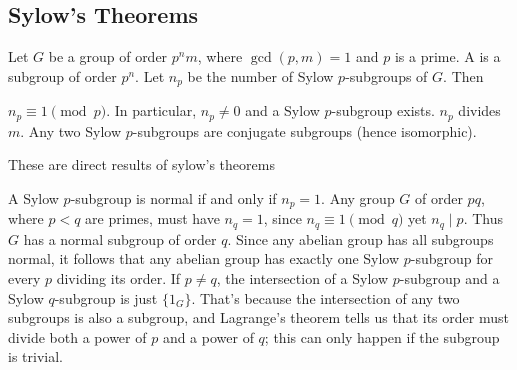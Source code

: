 \documentclass[11pt]{scrartcl}
\begin{document}
\subsection{Sylow's Theorems}
\begin{theorem}
	Let $G$ be a group of order $p^n m$,
	where $\gcd(p,m)=1$ and $p$ is a prime.
	A  is a subgroup of order $p^n$.
	Let $n_p$ be the number of Sylow $p$-subgroups of $G$.
	Then
	\begin{enumerate}[(a)]
		\ii $n_p \equiv 1 \pmod p$. In particular, $n_p \neq 0$ and
		a Sylow $p$-subgroup exists.
		\ii $n_p$ divides $m$.
		\ii Any two Sylow $p$-subgroups are conjugate subgroups (hence isomorphic).
	\end{enumerate}
\end{theorem}
\begin{prop}
These are direct results of sylow's theorems
\begin{itemize}
	\ii A Sylow $p$-subgroup is normal if and only if $n_p = 1$.
	\ii Any group $G$ of order $pq$, where $p < q$ are primes,
	must have $n_q = 1$, since $n_q \equiv 1 \pmod q$ yet $n_q \mid p$.
	Thus $G$ has a normal subgroup of order $q$.
	\ii Since any abelian group has all subgroups normal,
	it follows that any abelian group has exactly one Sylow $p$-subgroup
	for every $p$ dividing its order.
	\ii If $p \neq q$, the intersection of a Sylow $p$-subgroup and a Sylow $q$-subgroup is just $\{1_G\}$.
	That's because the intersection of any two subgroups is also a subgroup,
	and Lagrange's theorem tells us that its order must divide both a power of $p$
	and a power of $q$; this can only happen if the subgroup is trivial.
\end{itemize}
\end{prop}
\end{document}
